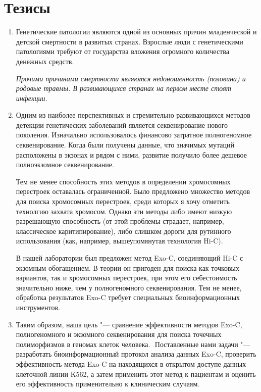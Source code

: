 \documentclass[a4paper,14pt]{extarticle}
\begin{document}
\newpage
\section*{Тезисы}

\begin{enumerate}
\item Генетические патологии являются одной из основных причин младенческой и детской смертности в развитых странах.
Взрослые люди с генетическими патологиями требуют от государства вложения огромного количества денежных средств.

\textit{Прочими причинами смертности являются недоношенность (половина) и родовые травмы.
В развивающихся странах на первом месте стоят инфекции.}

\item Одним из наиболее перспективных и стремительно развивающихся методов детекции генетических заболеваний является секвенирование нового поколения.
Изначально использовалось финансово затратное полногеномное секвенирование.
Когда были получены данные, что  значимых мутаций расположены в экзонах и рядом с ними, развитие получило более дешевое полноэкзомное секвенирование.

Тем не менее способность этих методов в определении хромосомных перестроек оставалась ограниченной.
Было предложено множество методов для поиска хромосомных перестроек, среди которых я хочу отметить технолгию захвата хромосом. Однако эти методы либо имеют низкую разрешающую способность (от этой проблемы страдает, например, классическое каритипирование), либо слишком дороги для рутинного использования (как, например, вышеупомянутая технология Hi-C).

В нашей лаборатории был предложен метод Exo-C, соединяющий Hi-C с экзомным обогащением.
В теории он пригоден для поиска как точковых вариантов, так и хромосомных перестроек, при этом его себестоимость значительно ниже, чем у полногеномного секвенирования.
Тем не менее, обработка результатов Exo-C требует специальных биоинформационных инструментов.

\item Таким образом, наша цель "--- сравнение эффективности методов Exo-C, полногеномного и экзомного секвенирования для поиска точечных полиморфизмов в геномах клеток человека. ​
Поставленные нами задачи "--- разработать биоинформационный протокол анализа данных Exo-C, проверить эффективность метода Exo-C на находящихся в открытом доступе данных клеточной линии K562, а затем применить этот метод к пациентам и оценить его эффективность применительно к клиническим случаям.


\end{enumerate}
\end{document}
